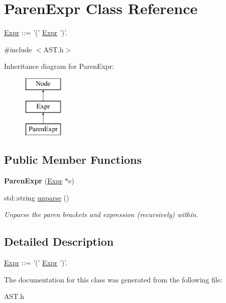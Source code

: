 \hypertarget{classParenExpr}{\section{Paren\-Expr Class Reference}
\label{classParenExpr}
}


\hyperlink{classExpr}{Expr} \-:\-:= '(' \hyperlink{classExpr}{Expr} ')'.  




{\ttfamily \#include $<$A\-S\-T.\-h$>$}

Inheritance diagram for Paren\-Expr\-:\begin{figure}[H]
\begin{center}
\leavevmode
\includegraphics[height=3.000000cm]{classParenExpr}
\end{center}
\end{figure}
\subsection*{Public Member Functions}
\begin{DoxyCompactItemize}
\item 
\hypertarget{classParenExpr_ad3b11932be46c6b7af4a71c4265cfa75}{{\bfseries Paren\-Expr} (\hyperlink{classExpr}{Expr} $\ast$e)}\label{classParenExpr_ad3b11932be46c6b7af4a71c4265cfa75}

\item 
\hypertarget{classParenExpr_a894bdf8546f0242c85b4664a2f9492cd}{std\-::string \hyperlink{classParenExpr_a894bdf8546f0242c85b4664a2f9492cd}{unparse} ()}\label{classParenExpr_a894bdf8546f0242c85b4664a2f9492cd}

\begin{DoxyCompactList}\small\item\em Unparse the paren brackets and expression (recursively) within. \end{DoxyCompactList}\end{DoxyCompactItemize}


\subsection{Detailed Description}
\hyperlink{classExpr}{Expr} \-:\-:= '(' \hyperlink{classExpr}{Expr} ')'. 

The documentation for this class was generated from the following file\-:\begin{DoxyCompactItemize}
\item 
A\-S\-T.\-h\end{DoxyCompactItemize}
